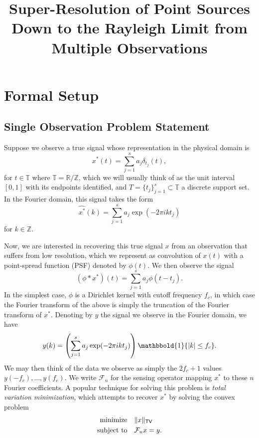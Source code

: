 \documentclass[11pt]{article}
\title{Super-Resolution of Point Sources Down to the Rayleigh Limit from Multiple Observations}
\author{}
\newcommand{\RR}{\mathbb{R}}
\newcommand{\TT}{\mathbb{T}}
\newcommand{\ZZ}{\mathbb{Z}}
\newcommand{\One}{\mathbbold{1}}
\newcommand{\sF}{\mathcal{F}}
\newcommand{\HS}{\hspace{3.5mm}}
\begin{document}
\maketitle

\noindent

\section{Formal Setup}

\subsection{Single Observation Problem Statement}

Suppose we observe a true signal whose representation in the physical domain is
\begin{equation}
    x^*(t) = \sum_{j = 1}^s a_j \delta_{t_j}(t),
\end{equation}
for $t \in \TT$ where $\TT = \RR / \ZZ$, which we will usually think of as the unit interval $[0, 1]$ with its endpoints identified, and $T = \{t_j\}_{j = 1}^s \subset \TT$ a discrete support set.
In the Fourier domain, this signal takes the form
\begin{equation}
    \widehat{x^*}(k) = \sum_{j = 1}^s a_j \exp(-2\pi i k t_j)
\end{equation}
for $k \in \ZZ$.

Now, we are interested in recovering this true signal $x$ from an observation that suffers from low resolution, which we represent as convolution of $x(t)$ with a point-spread function (PSF) denoted by $\phi(t)$.
We then observe the signal
\begin{equation}
    (\phi * x^*)(t) = \sum_{j = 1}^sa_j \phi(t - t_j).
\end{equation}
In the simplest case, $\phi$ is a Dirichlet kernel with cutoff frequency $f_c$, in which case the Fourier transform of the above is simply the truncation of the Fourier transform of $x^*$.
Denoting by $y$ the signal we observe in the Fourier domain, we have
\begin{equation}
    y(k) = \left(\sum_{j = 1}^s a_j \exp(-2\pi i k t_j)\right)\One\{|k| \leq f_c \}.
\end{equation}
We may then think of the data we observe as simply the $2f_c + 1$ values $y(-f_c), \dots, y(f_c)$.
We write $\sF_n$ for the sensing operator mapping $x^*$ to these $n$ Fourier coefficients.
A popular technique for solving this problem is \emph{total variation minimization}, which attempts to recover $x^*$ by solving the convex problem
\begin{align}
  \text{minimize} &\HS \|x\|_{\mathsf{TV}} \\
  \text{subject to} &\HS \sF_nx = y.
\end{align}
\end{document}
